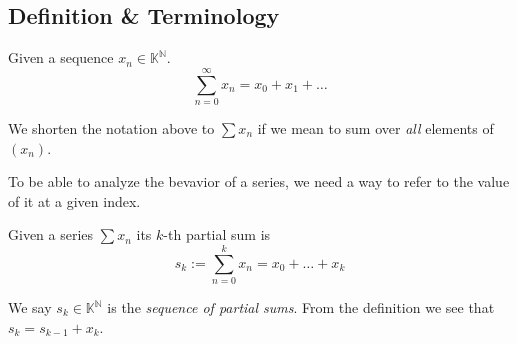 \subsection{Definition \& Terminology}
\begin{definition}[Series]
   Given a sequence \(x_n \in \mathbb{K}^\mathbb{N}\).
   \[\sum_{n=0}^{\infty} x_n = x_0 + x_1 + \ldots\]
\end{definition}
\begin{remark}[Notation]
   We shorten the notation above to \(\sum x_n\) if we mean to sum over \emph{all} elements of \((x_n)\).
\end{remark}
To be able to analyze the bevavior of a series, we need a way to refer to the value of it at a given index.
\begin{definition}
   Given a series \(\sum x_n\) its \(k\)-th partial sum is
   \[s_k := \sum_{n = 0}^{k} x_n = x_0 + \ldots + x_k\]
\end{definition}
\begin{remark}[Terminology]
   We say \(s_k \in \mathbb{K}^\mathbb{N}\) is the \emph{sequence of partial sums}.
   From the definition we see that \(s_k =  s_{k-1} + x_k\).
\end{remark}

